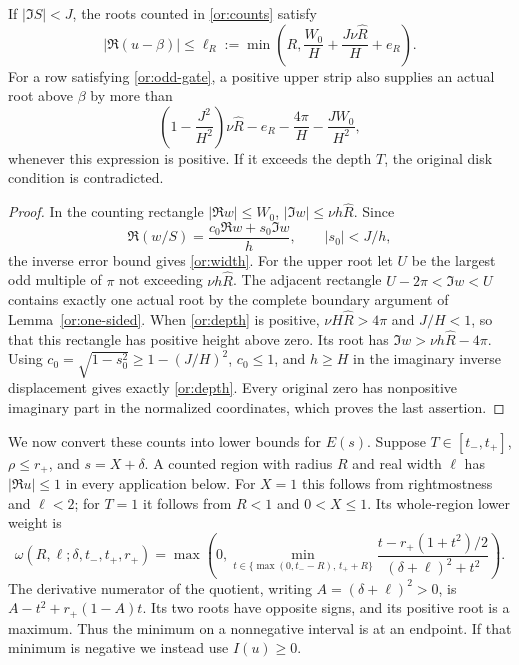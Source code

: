 \begin{lemma}\label{or:narrow-strip}
If $|\Im S|<J$, the roots counted in \eqref{or:counts} satisfy
\begin{equation}\label{or:width}
 |\Re(u-\beta)|\le\ell_R:=\min\left(R,
         \frac{W_0}{H}+\frac{J\nu\widehat R}{H}+e_R\right).
\end{equation}
For a row satisfying \eqref{or:odd-gate}, a positive upper strip
also supplies an actual root above $\beta$
by more than
\begin{equation}\label{or:depth}
 \left(1-\frac{J^2}{H^2}\right)\nu\widehat R-e_R
       -\frac{4\pi}{H}-\frac{JW_0}{H^2},
\end{equation}
whenever this expression is positive.  If it exceeds the depth $T$,
the original disk condition is contradicted.
\end{lemma}
\begin{proof}
In the counting rectangle $|\Re w|\le W_0$,
$|\Im w|\le\nu h\widehat R$.  Since
\[
 \Re(w/S)=\frac{c_0\Re w+s_0\Im w}{h},\qquad
 |s_0|<J/h,
\]
the inverse error bound gives \eqref{or:width}.
For the upper root let $U$ be the largest odd multiple of $\pi$
not exceeding $\nu h\widehat R$.
The adjacent rectangle $U-2\pi<\Im w<U$ contains exactly one
actual root by the complete boundary argument of
Lemma~\ref{or:one-sided}.  When \eqref{or:depth} is positive,
$\nu H\widehat R>4\pi$ and $J/H<1$, so that this rectangle has
positive height above zero.  Its root has
$\Im w>\nu h\widehat R-4\pi$.
Using $c_0=\sqrt{1-s_0^2}\ge1-(J/H)^2$, $c_0\le1$, and $h\ge H$
in the imaginary inverse displacement gives exactly
\eqref{or:depth}.  Every original zero has nonpositive imaginary
part in the normalized coordinates, which proves the last assertion.
\end{proof}

We now convert these counts into lower bounds for $E(s)$.  Suppose
$T\in[t_-,t_+]$, $\rho\le r_+$, and $s=X+\delta$.  A counted region
with radius $R$ and real width $\ell$ has $|\Re u|\le1$ in every
application below.  For $X=1$ this follows from rightmostness and
$\ell<2$; for $T=1$ it follows from $R<1$ and $0<X\le1$.
Its whole-region lower weight is
\begin{equation}\label{or:weight}
 \omega(R,\ell;\delta,t_-,t_+,r_+)
 =\max\left(0,\min_{t\in\{\max(0,t_--R),\,t_++R\}}
 \frac{t-r_+(1+t^2)/2}{(\delta+\ell)^2+t^2}\right).
\end{equation}
The derivative numerator of the quotient, writing
$A=(\delta+\ell)^2>0$, is
$A-t^2+r_+(1-A)t$.  Its two roots have opposite signs, and its
positive root is a maximum.  Thus the minimum on a nonnegative
interval is at an endpoint.  If that minimum is negative we instead
use $I(u)\ge0$.

